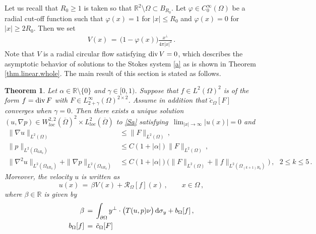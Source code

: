 \documentclass[11pt,a4paper]{article}
\newtheorem{theorem}{Theorem }[section]
\newcommand{\R}{\mathbb{R}}
\newcommand{\dd}{\,{\rm d}}
\begin{document}
Let us recall that $R_0\geq 1$ is taken so that $\R^2\setminus \Omega \subset B_{R_0}$. Let $\varphi\in C_0^\infty (\Omega)$ be a radial cut-off function such that $\varphi (x) =1$ for $|x|\leq R_0$ and $\varphi (x)=0$ for $|x|\geq 2 R_0$. Then we set 
%
\begin{align}
V(x) \, = \, \big(1-\varphi (x) \big) \frac{x^\bot}{4\pi |x|^2}\,.\label{def.V}
\end{align}
%
Note that $V$ is a radial circular flow satisfying ${\rm div}\, V=0$, which describes the asymptotic behavior of solutions to the Stokes system \eqref{a} as is shown in Theorem \ref{thm.linear.whole}. The main result of this section is stated as follows.
\begin{theorem}\label{thm.linear.exterior}
Let $\alpha \in \R \setminus \{0\}$ and $\gamma \in [0,1)$. Suppose that $f \in L^2 (\Omega)^2$ is of the form $f={\rm div}\, F$ with $F\in L^\infty_{2+\gamma} (\Omega)^{2\times 2}$. Assume in addition that $\tilde c_\Omega [F]$ converges when $\gamma=0$. Then there exists a unique  solution $(u, \nabla p)\in W^{2,2}_{loc} (\overline{\Omega})^2 \times L^2_{loc} (\overline{\Omega})$ to \eqref{Sa} satisfying \,$\displaystyle\lim_{|x|\rightarrow \infty} |u(x)|=0$ and
%
\begin{align}
\| \nabla u \|_{L^2 (\Omega)} & \leq \| F \|_{L^2 (\Omega)}\,, \label{est.thm.linear.exterior.0}\\
\| p \|_{L^2 (\Omega_{6 R_0})} & \leq C (1+|\alpha|) \| F\|_{L^2 (\Omega)}\,, \label{est.thm.linear.exterior.1}\\
\| \nabla^2 u \|_{L^2 (\Omega_{k R_0})}  + \| \nabla p \|_{L^2 (\Omega_{k R_0})} 
&\leq C (1+|\alpha|) \big ( \| F\|_{L^2 (\Omega)} + \| f\|_{L^2 (\Omega_{(k+1) R_0})}\big )\,,~~~2\leq k\leq 5\,.
\label{est.thm.linear.exterior.2}
\end{align}
\noindent
Moreover, the velocity $u$ is written as  
%
\begin{equation}\label{est.thm.linear.exterior.3}
u(x)  \, =\, \beta V(x)  + \mathcal{R}_\Omega [f](x)\,,  \qquad x\in \Omega\,,
\end{equation}
%
where $\beta\in \R$ is given by 
%
\begin{align}\label{est.thm.linear.exterior.5}
\begin{split}
\beta & \, = \,  \int_{\partial \Omega} y^\bot \cdot \big( T(u,p)\nu \big) \dd \sigma_{y} + b_\Omega [f]\,,\\
b_\Omega [f] & \, = \, \tilde c_\Omega [F] 

\end{split}
\end{align}
\end{theorem}
\end{document}
